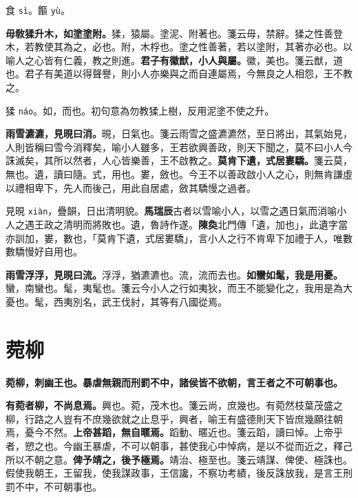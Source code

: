 \begin{quoting}食 \texttt{sì}。饇 \texttt{yù}。\end{quoting}

\textbf{毋敎猱升木，如塗塗附。}{\footnotesize 猱，猿屬。塗泥、附著也。箋云毋，禁辭。猱之性善登木，若教使其為之，必也。附，木桴也。塗之性善著，若以塗附，其著亦必也。以喻人之心皆有仁義，教之則進。}\textbf{君子有徽猷，小人與屬。}{\footnotesize 徽，美也。箋云猷，道也。君子有美道以得聲譽，則小人亦樂與之而自連屬焉，今無良之人相怨，王不教之。}

\begin{quoting}猱 \texttt{náo}。如，而也。初句意為勿教猱上樹，反用泥塗不使之升。\end{quoting}

\textbf{雨雪瀌瀌，見晛曰消。}{\footnotesize 晛，日氣也。箋云雨雪之盛瀌瀌然，至日將出，其氣始見，人則皆稱曰雪今消釋矣，喻小人雖多，王若欲興善政，則天下聞之，莫不曰小人今誅滅矣，其所以然者，人心皆樂善，王不啟教之。}\textbf{莫肯下遺，式居婁驕。}{\footnotesize 箋云莫，無也。遺，讀曰隨。式，用也。婁，斂也。今王不以善政啟小人之心，則無肯謙虛以禮相卑下，先人而後己，用此自居處，斂其驕慢之過者。}

\begin{quoting}見晛 \texttt{xiàn}，疊韻，日出清明貌。\textbf{馬瑞辰}古者以雪喻小人，以雪之遇日氣而消喻小人之遇王政之清明而將敗也。遺，魯詩作遂。\textbf{陳奐}北門傳「遺，加也」，此遺字當亦訓加，婁，數也，「莫肯下遺，式居婁驕」，言小人之行不肯卑下加禮于人，唯數數驕慢好自用也。\end{quoting}

\textbf{雨雪浮浮，見晛曰流。}{\footnotesize 浮浮，猶瀌瀌也。流，流而去也。}\textbf{如蠻如髦，我是用憂。}{\footnotesize 蠻，南蠻也。髦，夷髦也。箋云今小人之行如夷狄，而王不能變化之，我用是為大憂也。髦，西夷別名，武王伐紂，其等有八國從焉。}

\section{菀柳}


\textbf{菀柳，刺幽王也。暴虐無親而刑罰不中，諸侯皆不欲朝，言王者之不可朝事也。}

\textbf{有菀者柳，不尚息焉。}{\footnotesize 興也。菀，茂木也。箋云尚，庶幾也。有菀然枝葉茂盛之柳，行路之人豈有不庶幾欲就之止息乎，興者，喻王有盛德則天下皆庶幾願往朝焉，憂今不然。}\textbf{上帝甚蹈，無自暱焉。}{\footnotesize 蹈動、暱近也。箋云蹈，讀曰悼。上帝乎者，愬之也。今幽王暴虐，不可以朝事，甚使我心中悼病，是以不從而近之，釋己所以不朝之意。}\textbf{俾予靖之，後予極焉。}{\footnotesize 靖治、極至也。箋云靖謀、俾使、極誅也。假使我朝王，王留我，使我謀政事，王信讒，不察功考績，後反誅放我，是言王刑罰不中，不可朝事也。}

